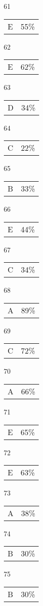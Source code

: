 \documentclass[12pt]{article}
\begin{document}
\begin{multicols}{5}
\begin{enumerate}
\item[61] \begin{tabular}{cc} E & 55\%\end{tabular}
\item[62] \begin{tabular}{cc} E & 62\%\end{tabular}
\item[63] \begin{tabular}{cc} D & 34\%\end{tabular}
\item[64] \begin{tabular}{cc} C & 22\%\end{tabular}
\item[65] \begin{tabular}{cc} B & 33\%\end{tabular}
\item[]
\item[66] \begin{tabular}{cc} E & 44\%\end{tabular}
\item[67] \begin{tabular}{cc} C & 34\%\end{tabular}
\item[68] \begin{tabular}{cc} A & 89\%\end{tabular}
\item[69] \begin{tabular}{cc} C & 72\%\end{tabular}
\item[70] \begin{tabular}{cc} A & 66\%\end{tabular}
\item[]
\item[71] \begin{tabular}{cc} E & 65\%\end{tabular}
\item[72] \begin{tabular}{cc} E & 63\%\end{tabular}
\item[73] \begin{tabular}{cc} A & 38\%\end{tabular}
\item[74] \begin{tabular}{cc} B & 30\%\end{tabular}
\item[75] \begin{tabular}{cc} B & 30\%\end{tabular}

\end{enumerate}
\end{multicols}
\end{document}
